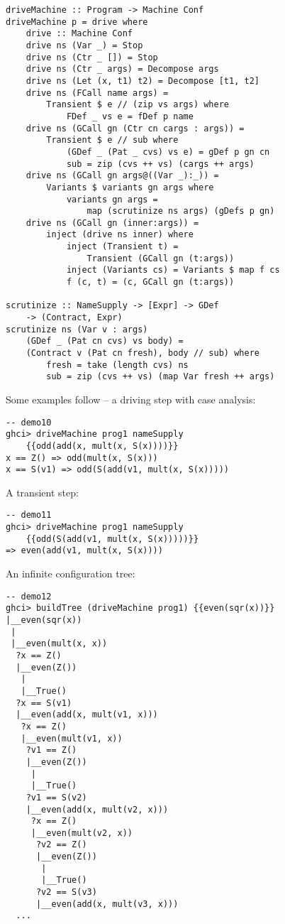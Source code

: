 \begin{lstlisting}[name=driving]
driveMachine :: Program -> Machine Conf
driveMachine p = drive where
	drive :: Machine Conf
	drive ns (Var _) = Stop
	drive ns (Ctr _ []) = Stop
	drive ns (Ctr _ args) = Decompose args
	drive ns (Let (x, t1) t2) = Decompose [t1, t2]
	drive ns (FCall name args) = 
		Transient $ e // (zip vs args) where
			FDef _ vs e = fDef p name
	drive ns (GCall gn (Ctr cn cargs : args)) = 
		Transient $ e // sub where
			(GDef _ (Pat _ cvs) vs e) = gDef p gn cn
			sub = zip (cvs ++ vs) (cargs ++ args)
	drive ns (GCall gn args@((Var _):_)) = 
		Variants $ variants gn args where
			variants gn args = 
				map (scrutinize ns args) (gDefs p gn)
	drive ns (GCall gn (inner:args)) = 
		inject (drive ns inner) where
			inject (Transient t) = 
				Transient (GCall gn (t:args))
			inject (Variants cs) = Variants $ map f cs
			f (c, t) = (c, GCall gn (t:args))

scrutinize :: NameSupply -> [Expr] -> GDef 
	-> (Contract, Expr)
scrutinize ns (Var v : args) 
	(GDef _ (Pat cn cvs) vs body) =
	(Contract v (Pat cn fresh), body // sub) where
		fresh = take (length cvs) ns
		sub = zip (cvs ++ vs) (map Var fresh ++ args)
\end{lstlisting}



Some examples follow -- a driving step with case analysis:
\begin{lstlisting}[style=demo]
-- demo10
ghci> driveMachine prog1 nameSupply 
	{{odd(add(x, mult(x, S(x))))}}
x == Z() => odd(mult(x, S(x)))
x == S(v1) => odd(S(add(v1, mult(x, S(x)))))
\end{lstlisting}

A transient step:
\begin{lstlisting}[style=demo]
-- demo11
ghci> driveMachine prog1 nameSupply 
	{{odd(S(add(v1, mult(x, S(x)))))}}
=> even(add(v1, mult(x, S(x))))
\end{lstlisting}

An infinite configuration tree:
\begin{lstlisting}[style=demo]
-- demo12
ghci> buildTree (driveMachine prog1) {{even(sqr(x))}}
|__even(sqr(x))
 |
 |__even(mult(x, x))
  ?x == Z()
  |__even(Z())
   |
   |__True()
  ?x == S(v1)
  |__even(add(x, mult(v1, x)))
   ?x == Z()
   |__even(mult(v1, x))
    ?v1 == Z()
    |__even(Z())
     |
     |__True()
    ?v1 == S(v2)
    |__even(add(x, mult(v2, x)))
     ?x == Z()
     |__even(mult(v2, x))
      ?v2 == Z()
      |__even(Z())
       |
       |__True()
      ?v2 == S(v3)
      |__even(add(x, mult(v3, x)))
  ...

\end{lstlisting}
